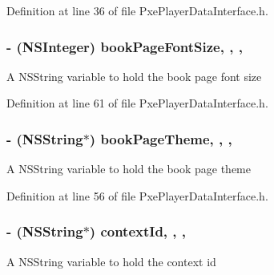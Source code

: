 Definition at line 36 of file Pxe\-Player\-Data\-Interface.\-h.

\hypertarget{interface_pxe_player_data_interface_a01914ef4755b7862ba543a0659613152}{
\subsubsection[{book\-Page\-Font\-Size}]{\setlength{\rightskip}{0pt plus 5cm}-\/ (N\-S\-Integer) book\-Page\-Font\-Size\hspace{0.3cm}{\ttfamily [read]}, {\ttfamily [write]}, {\ttfamily [nonatomic]}, {\ttfamily [assign]}}}\label{interface_pxe_player_data_interface_a01914ef4755b7862ba543a0659613152}
A N\-S\-String variable to hold the book page font size 

Definition at line 61 of file Pxe\-Player\-Data\-Interface.\-h.

\hypertarget{interface_pxe_player_data_interface_ac749acf5d0492c35a160be17973cab81}{
\subsubsection[{book\-Page\-Theme}]{\setlength{\rightskip}{0pt plus 5cm}-\/ (N\-S\-String$\ast$) book\-Page\-Theme\hspace{0.3cm}{\ttfamily [read]}, {\ttfamily [write]}, {\ttfamily [nonatomic]}, {\ttfamily [strong]}}}\label{interface_pxe_player_data_interface_ac749acf5d0492c35a160be17973cab81}
A N\-S\-String variable to hold the book page theme 

Definition at line 56 of file Pxe\-Player\-Data\-Interface.\-h.

\hypertarget{interface_pxe_player_data_interface_adeded8526816f9d96dd088511d4046d3}{
\subsubsection[{context\-Id}]{\setlength{\rightskip}{0pt plus 5cm}-\/ (N\-S\-String$\ast$) context\-Id\hspace{0.3cm}{\ttfamily [read]}, {\ttfamily [write]}, {\ttfamily [nonatomic]}, {\ttfamily [strong]}}}\label{interface_pxe_player_data_interface_adeded8526816f9d96dd088511d4046d3}
A N\-S\-String variable to hold the context id 


